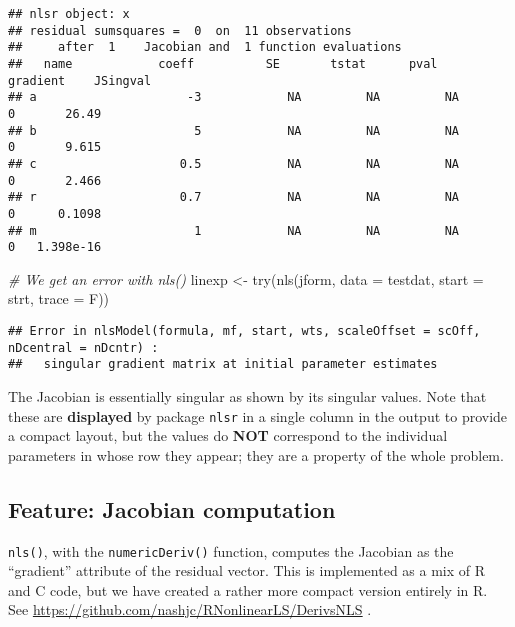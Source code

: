 \documentclass[
]{article}
\newenvironment{Shaded}{\begin{snugshade}}{\end{snugshade}}
\newcommand{\AttributeTok}[1]{\textcolor[rgb]{0.77,0.63,0.00}{#1}}
\newcommand{\CommentTok}[1]{\textcolor[rgb]{0.56,0.35,0.01}{\textit{#1}}}
\newcommand{\FunctionTok}[1]{\textcolor[rgb]{0.00,0.00,0.00}{#1}}
\newcommand{\NormalTok}[1]{#1}
\newcommand{\OtherTok}[1]{\textcolor[rgb]{0.56,0.35,0.01}{#1}}
\begin{document}
\begin{verbatim}
## nlsr object: x 
## residual sumsquares =  0  on  11 observations
##     after  1    Jacobian and  1 function evaluations
##   name            coeff          SE       tstat      pval      gradient    JSingval   
## a                     -3            NA         NA         NA           0       26.49  
## b                      5            NA         NA         NA           0       9.615  
## c                    0.5            NA         NA         NA           0       2.466  
## r                    0.7            NA         NA         NA           0      0.1098  
## m                      1            NA         NA         NA           0   1.398e-16
\end{verbatim}

\begin{Shaded}
\begin{Highlighting}[]
\CommentTok{\# We get an error with nls()}
\NormalTok{linexp }\OtherTok{\textless{}{-}} \FunctionTok{try}\NormalTok{(}\FunctionTok{nls}\NormalTok{(jform, }\AttributeTok{data =}\NormalTok{ testdat, }\AttributeTok{start =}\NormalTok{ strt, }\AttributeTok{trace =}\NormalTok{ F))}
\end{Highlighting}
\end{Shaded}

\begin{verbatim}
## Error in nlsModel(formula, mf, start, wts, scaleOffset = scOff, nDcentral = nDcntr) : 
##   singular gradient matrix at initial parameter estimates
\end{verbatim}

The Jacobian is essentially singular as shown by its singular values.
Note that these are \textbf{displayed} by package \texttt{nlsr} in a
single column in the output to provide a compact layout, but the values
do \textbf{NOT} correspond to the individual parameters in whose row
they appear; they are a property of the whole problem.

\hypertarget{feature-jacobian-computation}{%
\subsection{Feature: Jacobian
computation}\label{feature-jacobian-computation}}

\texttt{nls()}, with the \texttt{numericDeriv()} function, computes the
Jacobian as the ``gradient'' attribute of the residual vector. This is
implemented as a mix of R and C code, but we have created a rather more
compact version entirely in R. See
\url{https://github.com/nashjc/RNonlinearLS/DerivsNLS} .
\end{document}
